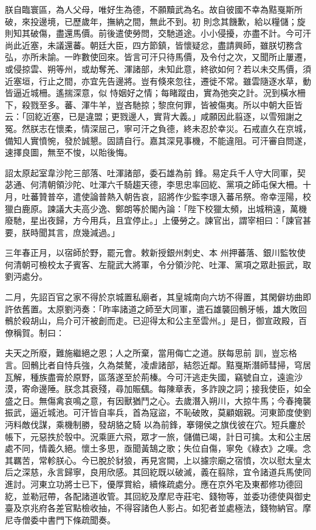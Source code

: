\begin{pinyinscope}
 朕自臨寰區，為人父母，唯好生為德，不願黷武為名。故自彼國不幸為黠戛斯所破，來投邊境，已歷歲年，撫納之間，無此不到。初
 則念其饑歉，給以糧儲；旋則知其破傷，盡還馬價。前後遣使勞問，交馳道途。小小侵擾，亦盡不計。今可汗尚此近塞，未議還蕃。朝廷大臣，四方節鎮，皆懷疑忿，盡請興師，雖朕切務含弘，亦所未諭。一昨數使回來。皆言可汗只待馬價，及令付之次，又聞所止屢遷，或侵掠雲、朔等州，或劫奪羌、渾諸部，未知此意，終欲如何？若以未交馬價，須近塞垣，行止之間，亦宜先告邊將。豈有倏來忽往，遷徙不常。雖雲隨逐水草，動皆逼近城柵。遙揣深意，似
 恃姻好之情；每睹蹤由，實為弛突之計。況到橫水柵下，殺戮至多。蕃、渾牛羊，豈吝馳掠；黎庶何罪，皆被傷夷。所以中朝大臣皆云：「回紇近塞，已是違盟；更戮邊人，實背大義。」咸願因此翦逐，以雪殂謝之冤。然朕志在懷柔，情深屈己，寧可汗之負德，終未忍於幸災。石戒直久在京城，備知人實憤惋，發於誠懇。固請自行。嘉其深見事機，不能違阻。可汗審自問遂，速擇良圖，無至不悛，以貽後悔。



 詔太原起室韋沙陀三部落、吐渾諸部，委石雄為前
 鋒。易定兵千人守大同軍，契苾通、何清朝領沙陀、吐渾六千騎趨天德，李思忠率回紇、黨項之師屯保大柵。十月，吐蕃贊普卒，遣使論普熱入朝告哀，詔將作少監李璟入蕃吊祭。帝幸涇陽，校獵白鹿原。諫議大夫高少逸、鄭朗等於閣內論：「陛下校獵太頻，出城稍遠，萬機廢馳，星出夜歸，方今用兵，且宜停止。」上優勞之。諫官出，謂宰相曰：「諫官甚要，朕時聞其言，庶幾減過。」



 三年春正月，以宿師於野，罷元會。敕新授銀州刺史、本
 州押蕃落、銀川監牧使何清朝可檢校太子賓客、左龍武大將軍，令分領沙陀、吐渾、黨項之眾赴振武，取劉沔處分。



 二月，先詔百官之家不得於京城置私廟者，其皇城南向六坊不得置，其閑僻坊曲即許依舊置。太原劉沔奏：「昨率諸道之師至大同軍，遣石雄襲回鶻牙帳，雄大敗回鶻於殺胡山，烏介可汗被創而走。已迎得太和公主至雲州。」是日，御宣政殿，百僚稱賀。制曰：



 夫天之所廢，難施繼絕之恩；人之所棄，當用侮亡之道。朕每思前
 訓，豈忘格言。回鶻比者自恃兵強，久為桀驁，凌虐諸部，結怨近鄰。黠戛斯潛師彗掃，穹居瓦解，種族盡膏於原野，區落遂至於荊榛。今可汗逃走失國，竊號自立，遠逾沙漠，寄命邊陲。朕念其衰殘，尋加賑颻。每陳章表，多詐諛之詞；接我使臣，如全盛之日。無傷禽哀鳴之意，有因獸猶鬥之心。去歲潛入朔川，大掠牛馬；今春掩襲振武，逼近城池。可汗皆自率兵，首為寇盜，不恥破敗，莫顧姻親。河東節度使劉沔料敵伐謀，乘機制勝，發胡貉之騎
 以為前鋒，搴翎侯之旗伐彼在穴。短兵鏖於帳下，元惡抶於彀中。況乘匪六飛，眾才一旅，儲備已竭，計日可擒。太和公主居處不同，情義久絕。懷土多思，亟聞黃鵠之歌；失位自傷，寧免《綠衣》之嘆。念其羈苦，常軫朕心。今已脫於豺狼，再見宮闕，上以攄宗廟之宿憤，次以慰太皇太后之深慈，永言歸寧，良用欣感。其回紇既以破滅，義在翦除，宜令諸道兵馬使同進討。河東立功將士已下，優厚賞給，續條疏處分。應在京外宅及東都修功德回
 紇，並勒冠帶，各配諸道收管。其回紇及摩尼寺莊宅、錢物等，並委功德使與御史臺及京兆府各差官點檢收抽，不得容諸色人影占。如犯者並處極法，錢物納官。摩尼寺僧委中書門下條疏聞奏。




\end{pinyinscope}

